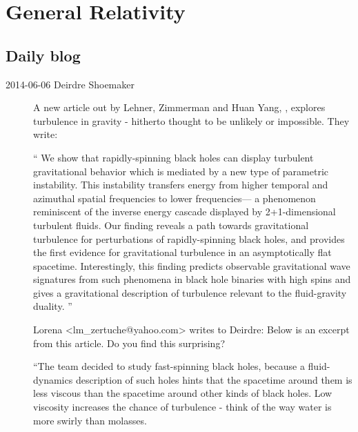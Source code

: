 
\chapter{General Relativity}
\label{c-GR}



\section{Daily blog}
\label{sect:GRblog}

\begin{description}
\item[2014-06-06 Deirdre Shoemaker]
A new article out by
{Lehner},
 {Zimmerman}
and Huan Yang,
,
explores turbulence in gravity - hitherto thought to be unlikely or
impossible. They write:

``
We show that rapidly-spinning black holes can display turbulent
gravitational behavior which is mediated by a new type of parametric
instability. This instability transfers energy from higher temporal and
azimuthal spatial frequencies to lower frequencies--- a phenomenon
reminiscent of the inverse energy cascade displayed by 2+1-dimensional
turbulent fluids. Our finding reveals a path towards gravitational
turbulence for perturbations of rapidly-spinning black holes, and
provides the first evidence for gravitational turbulence in an
asymptotically flat spacetime. Interestingly, this finding predicts
observable gravitational wave signatures from such phenomena in black
hole binaries with high spins and gives a gravitational description of
turbulence relevant to the fluid-gravity duality.
''


Lorena <lm\_zertuche@yahoo.com> writes to Deirdre:
Below is an excerpt from
{this article}. Do you find this surprising?

``The team decided to study fast-spinning black holes, because a
fluid-dynamics description of such holes hints that the spacetime around
them is less viscous than the spacetime around other kinds of black
holes. Low viscosity increases the chance of turbulence - think of the
way water is more swirly than molasses.


\end{description}

